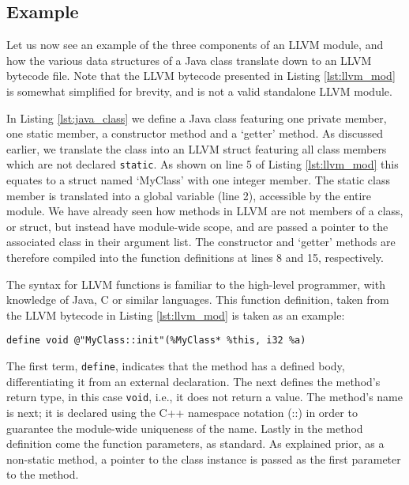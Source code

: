\subsection*{Example}

Let us now see an example of the three components of an LLVM module, and how the various data structures of a Java class translate down to an LLVM bytecode file. Note that the LLVM bytecode presented in Listing \ref{lst:llvm_mod} is somewhat simplified for brevity, and is not a valid standalone LLVM module.

In Listing \ref{lst:java_class} we define a Java class featuring one private member, one static member, a constructor method and a `getter' method. As discussed earlier, we translate the class into an LLVM struct featuring all class members which are not declared \verb|static|. As shown on line 5 of Listing \ref{lst:llvm_mod} this equates to a struct named `MyClass' with one integer member. The static class member is translated into a global variable (line 2), accessible by the entire module. We have already seen how methods in LLVM are not members of a class, or struct, but instead have module-wide scope, and are passed a pointer to the associated class in their argument list. The constructor and `getter' methods are therefore compiled into the function definitions at lines 8 and 15, respectively.

The syntax for LLVM functions is familiar to the high-level programmer, with knowledge of Java, C or similar languages. This function definition, taken from the LLVM bytecode in Listing \ref{lst:llvm_mod} is taken as an example:

\begin{lstlisting}[frame=single]
define void @"MyClass::init"(%MyClass* %this, i32 %a)
\end{lstlisting}

The first term, \verb|define|, indicates that the method has a defined body, differentiating it from an external declaration. The next defines the method's return type, in this case \verb|void|, i.e., it does not return a value. The method's name is next; it is declared using the C++ namespace notation (::) in order to guarantee the module-wide uniqueness of the name. Lastly in the method definition come the function parameters, as standard. As explained prior, as a non-static method, a pointer to the class instance is passed as the first parameter to the method.

\lstset{
	language=Java,
	basicstyle=\small,
	stringstyle=\ttfamily
}

